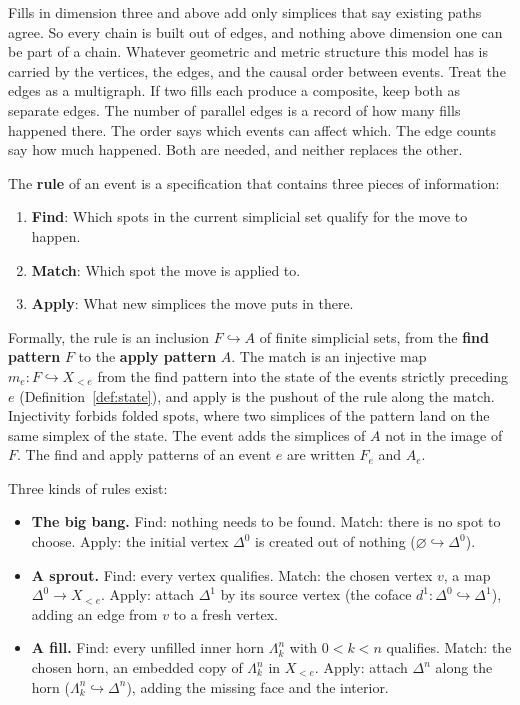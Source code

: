 Fills in dimension three and above add only simplices that say existing paths agree.
So every chain is built out of edges, and nothing above dimension one can be part of a chain.
Whatever geometric and metric structure this model has is carried by the vertices, the edges, and the causal order between events.
Treat the edges as a multigraph.
If two fills each produce a composite, keep both as separate edges.
The number of parallel edges is a record of how many fills happened there.
The order says which events can affect which.
The edge counts say how much happened.
Both are needed, and neither replaces the other.

\begin{definition}[Rule]
\label{def:rule}
The \textbf{rule} of an event is a specification that contains three pieces of information:
\begin{enumerate}
  \item \textbf{Find}: Which spots in the current simplicial set qualify for the move to happen.
  \item \textbf{Match}: Which spot the move is applied to.
  \item \textbf{Apply}: What new simplices the move puts in there.
\end{enumerate}
Formally, the rule is an inclusion $F \hookrightarrow A$ of finite simplicial sets, from the \textbf{find pattern} $F$ to the \textbf{apply pattern} $A$.
The match is an injective map $m_e : F \hookrightarrow X_{<e}$ from the find pattern into the state of the events strictly preceding $e$ (Definition~\ref{def:state}), and apply is the pushout of the rule along the match.
Injectivity forbids folded spots, where two simplices of the pattern land on the same simplex of the state.
The event adds the simplices of $A$ not in the image of $F$.
The find and apply patterns of an event $e$ are written $F_e$ and $A_e$.
\end{definition}

Three kinds of rules exist:

\begin{itemize}
  \item \textbf{The big bang.}
    Find: nothing needs to be found.
    Match: there is no spot to choose.
    Apply: the initial vertex $\Delta^0$ is created out of nothing ($\varnothing \hookrightarrow \Delta^0$).
  \item \textbf{A sprout.}
    Find: every vertex qualifies.
    Match: the chosen vertex $v$, a map $\Delta^0 \to X_{<e}$.
    Apply: attach $\Delta^1$ by its source vertex (the coface $d^1 : \Delta^0 \hookrightarrow \Delta^1$), adding an edge from $v$ to a fresh vertex.
  \item \textbf{A fill.}
    Find: every unfilled inner horn $\Lambda^n_k$ with $0 < k < n$ qualifies.
    Match: the chosen horn, an embedded copy of $\Lambda^n_k$ in $X_{<e}$.
    Apply: attach $\Delta^n$ along the horn ($\Lambda^n_k \hookrightarrow \Delta^n$), adding the missing face and the interior.
\end{itemize}

